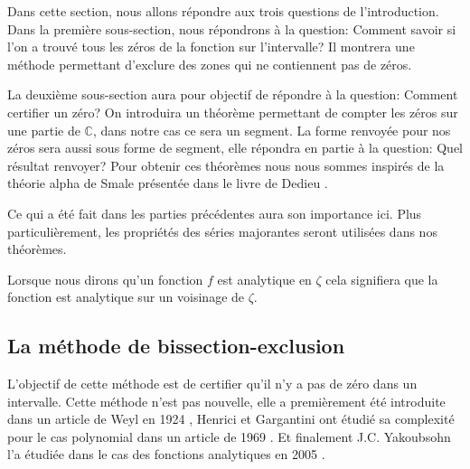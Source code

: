 \documentclass[a4paper,10pt]{article}
\begin{document}
	Dans cette section, nous allons répondre aux trois questions de l'introduction. Dans la première sous-section, nous répondrons à la question: Comment savoir si l'on a trouvé tous les zéros de la fonction sur l'intervalle? Il montrera une méthode permettant d'exclure des zones qui ne contiennent pas de zéros.
	
	La  deuxième sous-section aura pour objectif de répondre à la question: Comment certifier un zéro? On introduira un théorème permettant de compter les zéros sur une partie de $\mathbb{C}$, dans notre cas ce sera un segment. La forme renvoyée pour nos zéros sera aussi sous forme de segment, elle répondra en partie à la question: Quel résultat renvoyer? Pour obtenir ces théorèmes nous nous sommes inspirés de la théorie alpha de Smale présentée dans le livre de Dedieu \cite{dedieu2006points}.
	
	Ce qui a été fait dans les parties précédentes aura son importance ici. Plus particulièrement, les propriétés des séries majorantes seront utilisées dans nos théorèmes.
	
	\begin{remarque}
		Lorsque nous dirons qu'un fonction $f$ est analytique en $\zeta$ cela signifiera que la fonction est analytique sur un voisinage de $\zeta$.
	\end{remarque}

	\subsection{La méthode de bissection-exclusion}
	\label{subsec:bissectop}
	L'objectif de cette méthode est de certifier qu'il n'y a pas de zéro dans un intervalle.
	Cette méthode n'est pas nouvelle, elle a premièrement été introduite dans un article de Weyl en 1924 \cite{weyl1924randbemerkungen}, Henrici et Gargantini ont étudié sa complexité pour le cas polynomial dans un article de 1969 \cite{henrici1969uniformly}. Et finalement J.C. Yakoubsohn l'a étudiée dans le cas des fonctions analytiques en 2005 \cite{DBLP:journals/jc/Yakoubsohn05}.
	
\end{document}
